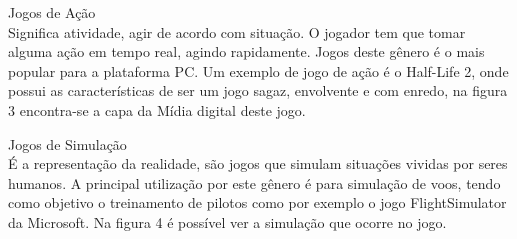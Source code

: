 \begin{alineascomponto}
\item Jogos de Ação\\
Significa atividade, agir de acordo com  situação. O jogador tem que tomar alguma ação em tempo real, agindo rapidamente. Jogos deste gênero é o mais popular para a plataforma PC. Um exemplo de jogo de ação é o Half-Life 2, onde possui as características de ser um jogo sagaz, envolvente e com enredo, na figura 3 encontra-se a capa da Mídia digital deste jogo. \cite{gen1}
\end{alineascomponto}
\begin{figure}[h!]
		\centering
	\end{figure}
\begin{alineascomponto}
\item Jogos de Simulação\\
É a representação da realidade, são jogos que simulam situações vividas por seres humanos. A principal utilização por este gênero é para simulação de voos, tendo como objetivo o treinamento de pilotos como por exemplo o jogo FlightSimulator da Microsoft. Na figura 4 é possível ver a simulação que ocorre no jogo. \cite{gen1}
\end{alineascomponto}
\begin{figure}[h!]
		\centering
	\end{figure}

